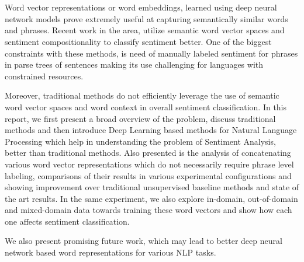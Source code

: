 \chapter{\abstractname}

 Word vector representations or  word embeddings, learned using deep neural network models prove extremely useful at capturing semantically similar words and phrases. Recent work in the area, utilize semantic word vector spaces and sentiment compositionality to classify sentiment better. One of the biggest constraints with these methods, is need of manually labeled sentiment for phrases in parse trees of sentences making its use challenging for languages with constrained resources. 	 
 \newline

	Moreover, traditional methods do not efficiently leverage the use of semantic word vector spaces and word context in overall sentiment classification. In this report, we first present a broad overview of the problem, discuss traditional methods and then introduce Deep Learning based methods for Natural Language Processing which help in understanding the problem of Sentiment Analysis, better than traditional methods. Also presented is the analysis of concatenating various word vector representations which do not necessarily require phrase level labeling, comparisons of  their results in various experimental configurations and showing  improvement over traditional unsupervised baseline methods and state of the art results. In the same experiment, we also explore in-domain, out-of-domain and mixed-domain data towards training these word vectors and show how each one affects sentiment classification.
\newline 

	We also present promising future work, which may lead to better deep neural network based word representations for various NLP tasks. 

